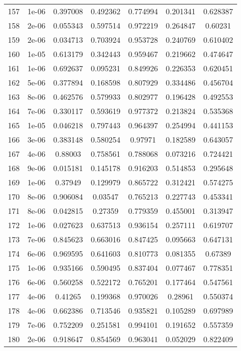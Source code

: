 \begin{table}
\begin{tabular*}{\linewidth}{c|c|c|c|c|c|c}
157 & 1e-06 & 0.397008 & 0.492362 & 0.774994 & 0.201341 & 0.628387\\
158 & 2e-06 & 0.055343 & 0.597514 & 0.972219 & 0.264847 & 0.60231\\
159 & 2e-06 & 0.034713 & 0.703924 & 0.953728 & 0.240769 & 0.610402\\
160 & 1e-05 & 0.613179 & 0.342443 & 0.959467 & 0.219662 & 0.474647\\
161 & 1e-06 & 0.692637 & 0.095231 & 0.849926 & 0.226353 & 0.620451\\
162 & 5e-06 & 0.377894 & 0.168598 & 0.807929 & 0.334486 & 0.456704\\
163 & 8e-06 & 0.462576 & 0.579933 & 0.802977 & 0.196428 & 0.492553\\
164 & 7e-06 & 0.330117 & 0.593619 & 0.977372 & 0.213824 & 0.535368\\
165 & 1e-05 & 0.046218 & 0.797443 & 0.964397 & 0.254994 & 0.441153\\
166 & 3e-06 & 0.383148 & 0.580254 & 0.97971 & 0.182589 & 0.643057\\
167 & 4e-06 & 0.88003 & 0.758561 & 0.788068 & 0.073216 & 0.724421\\
168 & 9e-06 & 0.015181 & 0.145178 & 0.916203 & 0.514853 & 0.295648\\
169 & 1e-06 & 0.37949 & 0.129979 & 0.865722 & 0.312421 & 0.574275\\
170 & 8e-06 & 0.906084 & 0.03547 & 0.765213 & 0.227743 & 0.453341\\
171 & 8e-06 & 0.042815 & 0.27359 & 0.779359 & 0.455001 & 0.313947\\
172 & 1e-06 & 0.027623 & 0.637513 & 0.936154 & 0.257111 & 0.619707\\
173 & 7e-06 & 0.845623 & 0.663016 & 0.847425 & 0.095663 & 0.647131\\
174 & 6e-06 & 0.969595 & 0.641603 & 0.810773 & 0.081355 & 0.67389\\
175 & 1e-06 & 0.935166 & 0.590495 & 0.837404 & 0.077467 & 0.778351\\
176 & 6e-06 & 0.560258 & 0.522172 & 0.765201 & 0.177464 & 0.547561\\
177 & 4e-06 & 0.41265 & 0.199368 & 0.970026 & 0.28961 & 0.550374\\
178 & 4e-06 & 0.662386 & 0.713546 & 0.935821 & 0.105289 & 0.697989\\
179 & 7e-06 & 0.752209 & 0.251581 & 0.994101 & 0.191652 & 0.557359\\
180 & 2e-06 & 0.918647 & 0.854569 & 0.963041 & 0.052029 & 0.822409\\
\end{tabular*}
\end{table}
